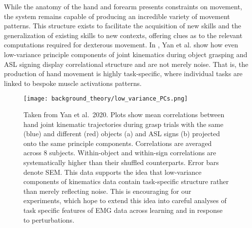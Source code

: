 \documentclass[../main.tex]{subfiles}
\begin{document}
While the anatomy of the hand and forearm presents constraints on movement, the system remains capable of producing an incredible variety of movement patterns\cite{yanUnexpectedComplexityEveryday2020,Basmajian1963}. This structure exists to facilitate the acquisition of new skills and the generalization of existing skills to new contexts, offering clues as to the relevant computations required for dexterous movement. In , Yan et al. show how even low-variance principle components of joint kinematics during object grasping and ASL signing display correlational structure and are not merely noise. That is, the production of hand movement is highly task-specific, where individual tasks are linked to bespoke muscle activations patterns.

\begin{figure}[!htb]
\centering
  \texttt{[image: background\_theory/low\_variance\_PCs.png]}
  \caption[Low-variance PCs contain task-relevant information]{Taken from Yan et al.~2020. Plots show mean correlations between hand joint kinematic trajectories during grasp trials with the same (blue) and different (red) objects (a) and ASL signs (b) projected onto the same principle components. Correlations are averaged across 8 subjects. Within-object and within-sign correlations are systematically higher than their shuffled counterparts. Error bars denote SEM. This data supports the idea that low-variance components of kinematics data contain task-specific structure rather than merely reflecting noise. This is encouraging for our experiments, which hope to extend this idea into careful analyses of task specific features of EMG data across learning and in response to perturbations.}\label{fig:low_variance_PCs}
\end{figure}

\end{document}
